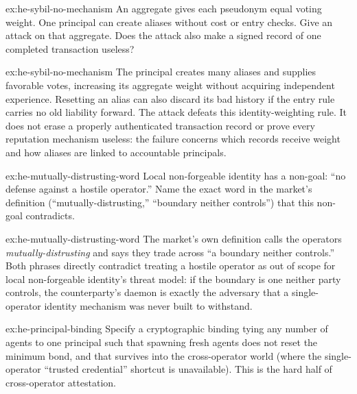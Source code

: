\documentclass[11pt,a4paper]{article}
\theoremstyle{definition}
\theoremstyle{definition}
\theoremstyle{remark}
\begin{document}
\begin{pdexercise}[kind=Check,rating=1]{ex:he-sybil-no-mechanism}
An aggregate gives each pseudonym equal voting weight. One principal can
create aliases without cost or entry checks. Give an attack on that aggregate.
Does the attack also make a signed record of one completed transaction useless?
\end{pdexercise}
\begin{pdsolution}{ex:he-sybil-no-mechanism}
The principal creates many aliases and supplies favorable votes, increasing
its aggregate weight without acquiring independent experience. Resetting an alias
can also discard its bad history if the entry rule carries no old liability
forward. The attack defeats this identity-weighting rule. It does not erase a
properly authenticated transaction record or prove every reputation mechanism
useless: the failure concerns which records receive weight and how aliases are
linked to accountable principals.
\end{pdsolution}
\begin{pdexercise}[kind=Check,rating=1]{ex:he-mutually-distrusting-word}
Local non-forgeable identity has a non-goal: ``no defense against a hostile
  operator.'' Name the exact word in the market's definition
  (``mutually-distrusting,'' ``boundary neither controls'') that this non-goal
  contradicts.
\end{pdexercise}
\begin{pdsolution}{ex:he-mutually-distrusting-word}
The market's own definition calls the operators \emph{mutually-distrusting}
and says they trade across ``a boundary neither controls.'' Both phrases
directly contradict treating a hostile operator as out of scope for local
non-forgeable identity's threat model: if the boundary is one neither party
controls, the counterparty's daemon is exactly the adversary that a
single-operator identity mechanism was never built to withstand.
\end{pdsolution}
\begin{pdexercise}[kind=Open,rating=3]{ex:he-principal-binding}
Specify a cryptographic binding tying any number of agents to one principal
  such that spawning fresh agents does not reset the minimum bond, and that survives
  into the cross-operator world (where the single-operator ``trusted credential''
  shortcut is unavailable). This is the hard half of cross-operator attestation.
\end{pdexercise}
\end{document}

